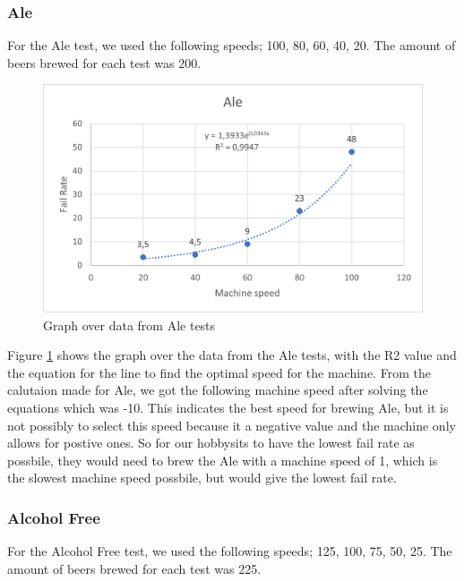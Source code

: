 \subsubsection{Ale}
For the Ale test, we used the following speeds; 100, 80, 60, 40, 20. The amount of beers brewed for each test was 200.

\begin{center}
    \centering
    \begin{figure}[H]
        \includegraphics[width=1\textwidth]{img/Ale_graph.png}
        \caption{Graph over data from Ale tests}
        \label{fig:Ale_graph}
    \end{figure}
\end{center}

Figure \ref{fig:Ale_graph} shows the graph over the data from the Ale tests, with the R2 value and the equation for the line to find the optimal speed for the machine. \newline
From the calutaion made for Ale, we got the following machine speed after solving the equations which was -10. This indicates the best speed for brewing Ale, but it is not possibly to select this speed because it a negative value and the machine only allows for postive ones. 
So for our hobbysits to have the lowest fail rate as possbile, they would need to brew the Ale with a machine speed of 1, which is the slowest machine speed possbile, but would give the lowest fail rate. \newline


\subsubsection{Alcohol Free}
For the Alcohol Free test, we used the following speeds; 125, 100, 75, 50, 25. The amount of beers brewed for each test was 225.

